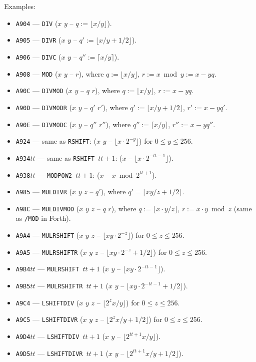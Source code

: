 \documentclass[12pt,oneside]{article}
\begin{document}
Examples:
\begin{itemize}
\item {\tt A904} --- {\tt DIV} ($x$ $y$ -- $q:=\lfloor x/y\rfloor$).
\item {\tt A905} --- {\tt DIVR} ($x$ $y$ -- $q':=\lfloor x/y+1/2\rfloor$).
\item {\tt A906} --- {\tt DIVC} ($x$ $y$ -- $q'':=\lceil x/y\rceil$).
\item {\tt A908} --- {\tt MOD} ($x$ $y$ -- $r$), where $q:=\lfloor x/y\rfloor$, $r:=x\bmod y:=x-yq$.
\item {\tt A90C} --- {\tt DIVMOD} ($x$ $y$ -- $q$ $r$), where $q:=\lfloor x/y\rfloor$, $r:=x-yq$.
\item {\tt A90D} --- {\tt DIVMODR} ($x$ $y$ -- $q'$ $r'$), where $q':=\lfloor x/y+1/2\rfloor$, $r':=x-yq'$.
\item {\tt A90E} --- {\tt DIVMODC} ($x$ $y$ -- $q''$ $r''$), where $q'':=\lceil x/y\rceil$, $r'':=x-yq''$.
\item {\tt A924} --- same as {\tt RSHIFT}: ($x$ $y$ -- $\lfloor x\cdot 2^{-y}\rfloor$) for $0\leq y\leq 256$.
\item {\tt A934$tt$} --- same as {\tt RSHIFT $tt+1$}: ($x$ -- $\lfloor x\cdot 2^{-tt-1}\rfloor$).
\item {\tt A938$tt$} --- {\tt MODPOW2 $tt+1$}: ($x$ -- $x\bmod 2^{tt+1}$).
\item {\tt A985} --- {\tt MULDIVR} ($x$ $y$ $z$ -- $q'$), where $q'=\lfloor xy/z+1/2\rfloor$.
\item {\tt A98C} --- {\tt MULDIVMOD} ($x$ $y$ $z$ -- $q$ $r$), where $q:=\lfloor x\cdot y/z\rfloor$, $r:=x\cdot y\bmod z$ (same as {\tt */MOD} in Forth).
\item {\tt A9A4} --- {\tt MULRSHIFT} ($x$ $y$ $z$ -- $\lfloor xy\cdot2^{-z}\rfloor$) for $0\leq z\leq 256$.
\item {\tt A9A5} --- {\tt MULRSHIFTR} ($x$ $y$ $z$ -- $\lfloor xy\cdot2^{-z}+1/2\rfloor$) for $0\leq z\leq 256$.
\item {\tt A9B4$tt$} --- {\tt MULRSHIFT $tt+1$} ($x$ $y$ -- $\lfloor xy\cdot 2^{-tt-1}\rfloor$).
\item {\tt A9B5$tt$} --- {\tt MULRSHIFTR $tt+1$} ($x$ $y$ -- $\lfloor xy\cdot 2^{-tt-1}+1/2\rfloor$).
\item {\tt A9C4} --- {\tt LSHIFTDIV} ($x$ $y$ $z$ -- $\lfloor 2^zx/y\rfloor$) for $0\leq z\leq 256$.
\item {\tt A9C5} --- {\tt LSHIFTDIVR} ($x$ $y$ $z$ -- $\lfloor 2^zx/y+1/2\rfloor$) for $0\leq z\leq 256$.
\item {\tt A9D4$tt$} --- {\tt LSHIFTDIV $tt+1$} ($x$ $y$ -- $\lfloor 2^{tt+1}x/y\rfloor$).
\item {\tt A9D5$tt$} --- {\tt LSHIFTDIVR $tt+1$} ($x$ $y$ -- $\lfloor 2^{tt+1}x/y+1/2\rfloor$).
\end{itemize}
\end{document}
